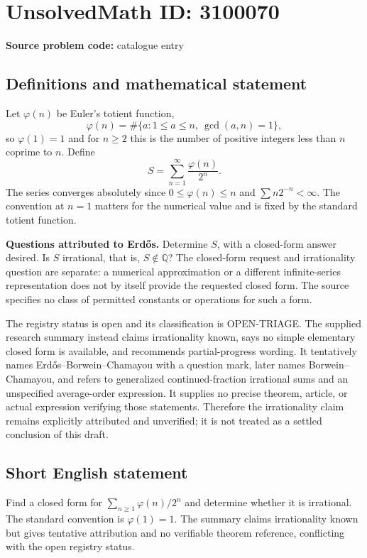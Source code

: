 \documentclass[11pt]{article}
\newcommand{\Q}{\mathbb{Q}}
\begin{document}
\section*{UnsolvedMath ID: 3100070}
\textbf{Source problem code:} catalogue entry
\subsection{Definitions and mathematical statement}
Let $\varphi(n)$ be Euler's totient function,
\[
 \varphi(n)=\#\{a:1\leq a\leq n,\ \gcd(a,n)=1\},
\]
so $\varphi(1)=1$ and for $n\geq2$ this is the number of positive integers less than $n$ coprime to $n$. Define
\[
 S=\sum_{n=1}^{\infty}\frac{\varphi(n)}{2^n}.
\]
The series converges absolutely since $0\leq\varphi(n)\leq n$ and $\sum n2^{-n}<\infty$. The convention at $n=1$ matters for the numerical value and is fixed by the standard totient function.

\textbf{Questions attributed to Erd\H{o}s.} Determine $S$, with a closed-form answer desired. Is $S$ irrational, that is, $S\notin\Q$? The closed-form request and irrationality question are separate: a numerical approximation or a different infinite-series representation does not by itself provide the requested closed form. The source specifies no class of permitted constants or operations for such a form.

The registry status is open and its classification is OPEN-TRIAGE. The supplied research summary instead claims irrationality known, says no simple elementary closed form is available, and recommends partial-progress wording. It tentatively names Erd\H{o}s--Borwein--Chamayou with a question mark, later names Borwein--Chamayou, and refers to generalized continued-fraction irrational sums and an unspecified average-order expression. It supplies no precise theorem, article, or actual expression verifying those statements. Therefore the irrationality claim remains explicitly attributed and unverified; it is not treated as a settled conclusion of this draft.
\subsection{Short English statement}
Find a closed form for $\sum_{n\geq1}\varphi(n)/2^n$ and determine whether it is irrational. The standard convention is $\varphi(1)=1$. The summary claims irrationality known but gives tentative attribution and no verifiable theorem reference, conflicting with the open registry status.
\end{document}
